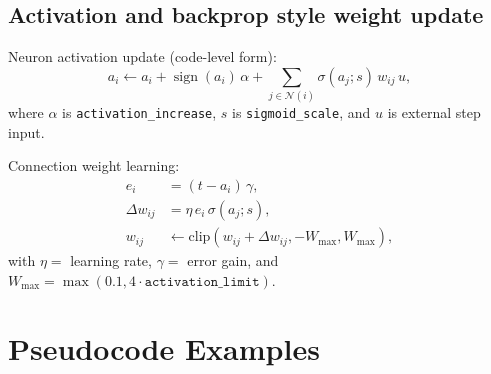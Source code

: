 \documentclass[11pt,a4paper]{report}
\begin{document}
\section{Activation and backprop style weight update}
Neuron activation update (code-level form):
\begin{equation}
a_i \leftarrow a_i + \operatorname{sign}(a_i)\,\alpha + \sum_{j \in \mathcal{N}(i)} \sigma(a_j; s)\,w_{ij}\,u,
\end{equation}
where $\alpha$ is \texttt{activation\_increase}, $s$ is \texttt{sigmoid\_scale}, and $u$ is external step input.

Connection weight learning:
\begin{align}
e_i &= (t-a_i)\,\gamma, \\
\Delta w_{ij} &= \eta\,e_i\,\sigma(a_j; s), \\
w_{ij} &\leftarrow \text{clip}(w_{ij} + \Delta w_{ij}, -W_{\max}, W_{\max}),
\end{align}
with $\eta=$ learning rate, $\gamma=$ error gain, and $W_{\max}=\max(0.1, 4\cdot\texttt{activation\_limit})$.

\chapter{Pseudocode Examples}
\end{document}
